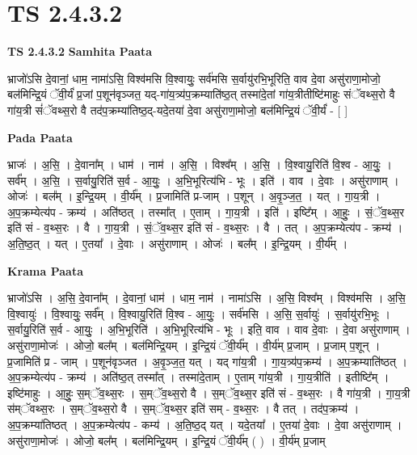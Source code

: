 \documentclass[17pt]{extarticle}
\begin{document}
\section*{ TS 2.4.3.2 }

\textbf{TS 2.4.3.2 } \newline
\textbf{Samhita Paata} \newline

भ्राजो॑ऽसि दे॒वानां॒ धाम॒ नामा॑ऽसि॒ विश्व॑मसि वि॒श्वायुः॒ सर्व॑मसि स॒र्वायु॑रभि॒भूरिति॒ वाव दे॒वा असु॑राणा॒मोजो॒ बल॑मिन्द्रि॒यं ॅवी॒र्यं॑ प्र॒जां प॒शून॑वृञ्जत॒ यद्-गा॑य॒त्र्य॑प॒क्रम्याति॑ष्ठ॒त् तस्मा॑दे॒तां गा॑य॒त्रीतीष्टि॑माहुः संॅवथ्स॒रो वै गा॑य॒त्री सं॑ॅवथ्स॒रो वै तद॑प॒क्रम्या॑तिष्ठ॒द्-यदे॒तया॑ दे॒वा असु॑राणा॒मोजो॒ बल॑मिन्द्रि॒यं ॅवी॒र्यं॑ - [  ] \newline

\textbf{Pada Paata} \newline

भ्राजः॑ । अ॒सि॒ । दे॒वाना᳚म् । धाम॑ । नाम॑ । अ॒सि॒ । विश्व᳚म् । अ॒सि॒ । वि॒श्वायु॒रिति॑ वि॒श्व - आ॒युः॒ । सर्व᳚म् । अ॒सि॒ । स॒र्वायु॒रिति॑ स॒र्व - आ॒युः॒ । अ॒भि॒भूरित्य॑भि - भूः । इति॑ । वाव । दे॒वाः । असु॑राणाम् । ओजः॑ । बल᳚म् । इ॒न्द्रि॒यम् । वी॒र्य᳚म् । प्र॒जामिति॑ प्र-जाम् । प॒शून् । अ॒वृ॒ञ्ज॒त॒ । यत् । गा॒य॒त्री । अ॒प॒क्रम्येत्य॑प - क्रम्य॑ । अति॑ष्ठत् । तस्मा᳚त् । ए॒ताम् । गा॒य॒त्री । इति॑ । इष्टि᳚म् । आ॒हुः॒ । सं॒ॅव॒थ्स॒र इति॑ सं - व॒थ्स॒रः । वै । गा॒य॒त्री । सं॒ॅव॒थ्स॒र इति॑ सं - व॒थ्स॒रः । वै । तत् । अ॒प॒क्रम्येत्य॑प - क्रम्य॑ । अ॒ति॒ष्ठ॒त् । यत् । ए॒तया᳚ । दे॒वाः । असु॑राणाम् । ओजः॑ । बल᳚म् । इ॒न्द्रि॒यम् । वी॒र्य᳚म् ।  \newline


\textbf{Krama Paata} \newline

भ्राजो॑ऽसि । अ॒सि॒ दे॒वाना᳚म् । दे॒वानां॒ धाम॑ । धाम॒ नाम॑ । नामा॑ऽसि । अ॒सि॒ विश्व᳚म् । विश्व॑मसि । अ॒सि॒ वि॒श्वायुः॑ । वि॒श्वायुः॒ सर्व᳚म् । वि॒श्वायु॒रिति॑ वि॒श्व - आ॒युः॒ । सर्व॑मसि । अ॒सि॒ स॒र्वायुः॑ । स॒र्वायु॑रभि॒भूः । स॒र्वायु॒रिति॑ स॒र्व - आ॒युः॒ । अ॒भि॒भूरिति॑ । अ॒भि॒भूरित्य॑भि - भूः । इति॒ वाव । वाव दे॒वाः । दे॒वा असु॑राणाम् । असु॑राणा॒मोजः॑ । ओजो॒ बल᳚म् । बल॑मिन्द्रि॒यम् । इ॒न्द्रि॒यं ॅवी॒र्य᳚म् । वी॒र्य॑म् प्र॒जाम् । प्र॒जाम् प॒शून् । प्र॒जामिति॑ प्र - जाम् । प॒शून॑वृञ्जत । अ॒वृ॒ञ्ज॒त॒ यत् । यद् गा॑य॒त्री । गा॒य॒त्र्य॑प॒क्रम्य॑ । अ॒प॒क्रम्याति॑ष्ठत् । अ॒प॒क्रम्येत्य॑प - क्रम्य॑ । अति॑ष्ठ॒त् तस्मा᳚त् । तस्मा॑दे॒ताम् । ए॒ताम् गा॑य॒त्री । गा॒य॒त्रीति॑ । इतीष्टि᳚म् । इष्टि॑माहुः । आ॒हुः॒ स॒म्ॅव॒थ्स॒रः । स॒म्ॅव॒थ्स॒रो वै । स॒म्ॅव॒थ्स॒र इति॑ सं - व॒थ्स॒रः । वै गा॑य॒त्री । गा॒य॒त्री स॑म्ॅवथ्स॒रः । स॒म्ॅव॒थ्स॒रो वै । स॒म्ॅव॒थ्स॒र इति॑ सम् - व॒थ्स॒रः । वै तत् । तद॑प॒क्रम्य॑ । अ॒प॒क्रम्या॑तिष्ठत् । अ॒प॒क्रम्येत्य॑प - कम्य॑ । अ॒ति॒ष्ठ॒द् यत् । यदे॒तया᳚ । ए॒तया॑ दे॒वाः । दे॒वा असु॑राणाम् । असु॑राणा॒मोजः॑ । ओजो॒ बल᳚म् । बल॑मिन्द्रि॒यम् । इ॒न्द्रि॒यं ॅवी॒र्य᳚म् ( ) । 
वी॒र्य॑म् प्र॒जाम् \newline
\end{document}
